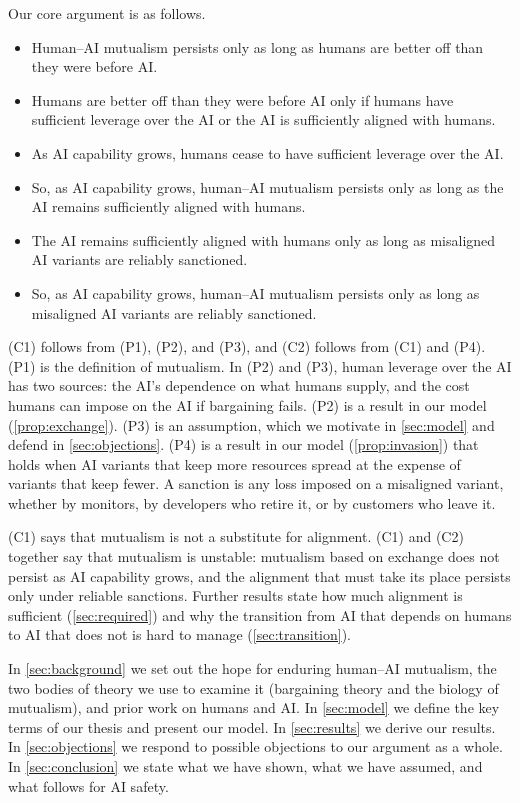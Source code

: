 \documentclass[article, 11pt, reqno]{amsart}
\theoremstyle{named}
\theoremstyle{plain}
\begin{document}
Our core argument is as follows.
\begin{itemize}
\item[(P1)] Human--AI mutualism persists only as long as humans are better off than they were before AI.
\item[(P2)] Humans are better off than they were before AI only if humans have sufficient leverage over the AI or the AI is sufficiently aligned with humans.
\item[(P3)] As AI capability grows, humans cease to have sufficient leverage over the AI.
\item[(C1)] So, as AI capability grows, human--AI mutualism persists only as long as the AI remains sufficiently aligned with humans.
\item[(P4)] The AI remains sufficiently aligned with humans only as long as misaligned AI variants are reliably sanctioned.
\item[(C2)] So, as AI capability grows, human--AI mutualism persists only as long as misaligned AI variants are reliably sanctioned.
\end{itemize}
(C1) follows from (P1), (P2), and (P3), and (C2) follows from (C1) and (P4). (P1) is the definition of mutualism. In (P2) and (P3), human leverage over the AI has two sources: the AI's dependence on what humans supply, and the cost humans can impose on the AI if bargaining fails. (P2) is a result in our model (\cref{prop:exchange}). (P3) is an assumption, which we motivate in \cref{sec:model} and defend in \cref{sec:objections}. (P4) is a result in our model (\cref{prop:invasion}) that holds when AI variants that keep more resources spread at the expense of variants that keep fewer. A sanction is any loss imposed on a misaligned variant, whether by monitors, by developers who retire it, or by customers who leave it.

(C1) says that mutualism is not a substitute for alignment. (C1) and (C2) together say that mutualism is unstable: mutualism based on exchange does not persist as AI capability grows, and the alignment that must take its place persists only under reliable sanctions. Further results state how much alignment is sufficient (\cref{sec:required}) and why the transition from AI that depends on humans to AI that does not is hard to manage (\cref{sec:transition}).

In \cref{sec:background} we set out the hope for enduring human--AI mutualism, the two bodies of theory we use to examine it (bargaining theory and the biology of mutualism), and prior work on humans and AI. In \cref{sec:model} we define the key terms of our thesis and present our model. In \cref{sec:results} we derive our results. In \cref{sec:objections} we respond to possible objections to our argument as a whole. In \cref{sec:conclusion} we state what we have shown, what we have assumed, and what follows for AI safety.
\end{document}
